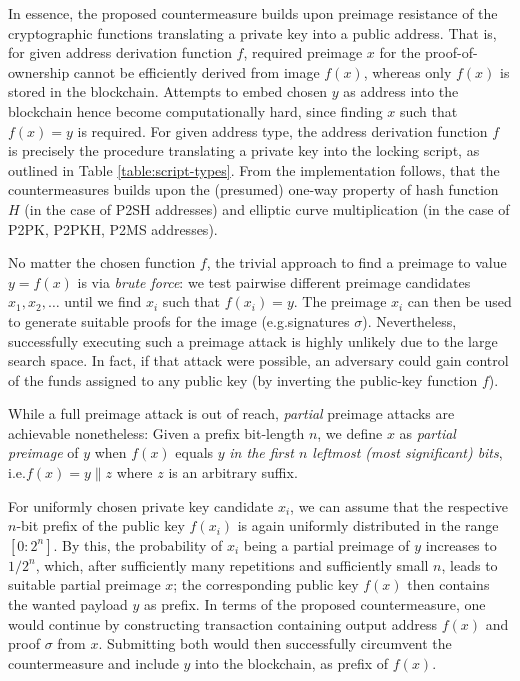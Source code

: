 \documentclass[a4paper,11pt,titlepage]{scrbook}
\begin{document}
In essence, the proposed countermeasure builds upon preimage resistance of the cryptographic functions translating a private key into a public address.
That is, for given address derivation function $f$, required preimage $x$ for the proof-of-ownership cannot be efficiently derived from image $f(x)$, whereas only $f(x)$ is stored in the blockchain.
Attempts to embed chosen $y$ as address into the blockchain hence become computationally hard, since finding $x$ such that $f(x)=y$ is required.
For given address type, the address derivation function $f$ is precisely the procedure translating a private key into the locking script, as outlined in Table \ref{table:script-types}.
From the implementation follows, that the countermeasures builds upon the (presumed) one-way property of hash function $H$ (in the case of P2SH addresses) and elliptic curve multiplication (in the case of P2PK, P2PKH, P2MS addresses).

No matter the chosen function $f$, the trivial approach to find a preimage to value $y=f(x)$ is via \emph{brute force}: we test pairwise different preimage candidates $x_1, x_2, \dots$ until we find $x_i$ such that $f(x_i)=y$.
The preimage $x_i$ can then be used to generate suitable proofs for the image (e.g.\@ signatures $\sigma$).
Nevertheless, successfully executing such a preimage attack is highly unlikely due to the large search space.
In fact, if that attack were possible, an adversary could gain control of the funds assigned to any public key (by inverting the public-key function $f$).

While a full preimage attack is out of reach, \emph{partial} preimage attacks are achievable nonetheless:
Given a prefix bit-length $n$, we define $x$ as \emph{partial preimage} of $y$ when $f(x)$ equals $y$ \emph{in the first $n$ leftmost (most significant) bits}, i.e.\@ $f(x)=y\|z$ where $z$ is an arbitrary suffix.

For uniformly chosen private key candidate $x_i$, we can assume that the respective $n$-bit prefix of the public key $f(x_i)$ is again uniformly distributed in the range $[0{:}2^n]$.
By this, the probability of $x_i$ being a partial preimage of $y$ increases to $1/2^n$, which, after sufficiently many repetitions and sufficiently small $n$, leads to suitable partial preimage $x$; the corresponding public key $f(x)$ then contains the wanted payload $y$ as prefix.
In terms of the proposed countermeasure, one would continue by constructing transaction containing output address $f(x)$ and proof $\sigma$ from $x$.
Submitting both would then successfully circumvent the countermeasure and include $y$ into the blockchain, as prefix of $f(x)$.
\end{document}
